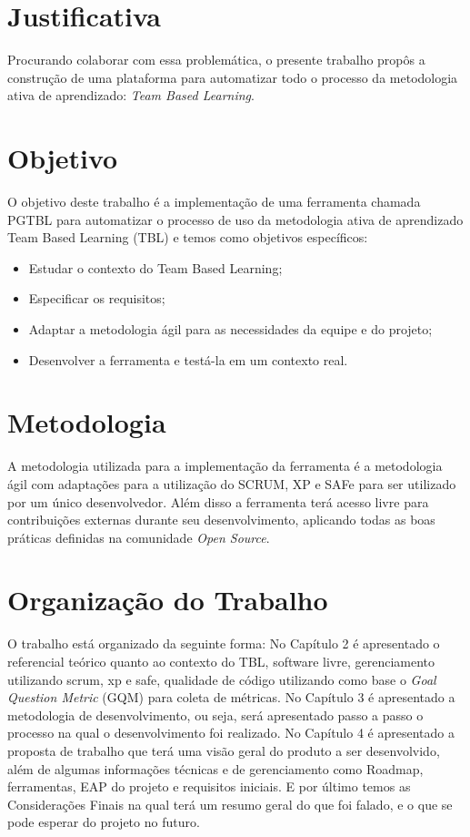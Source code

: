 \section{Justificativa}

Procurando colaborar com essa problemática, o presente trabalho propôs a construção de uma plataforma para automatizar
todo o processo da metodologia ativa de aprendizado: \textit{Team Based Learning}.

\section{Objetivo}

O objetivo deste trabalho é a implementação de uma ferramenta chamada PGTBL para automatizar o processo de uso da metodologia ativa de aprendizado Team Based Learning (TBL) e temos como objetivos específicos:

\begin{itemize}
  \item Estudar o contexto do Team Based Learning;
  \item Especificar os requisitos;
  \item Adaptar a metodologia ágil para as necessidades da equipe e do projeto;
  \item Desenvolver a ferramenta e testá-la em um contexto real.
\end{itemize}

\section{Metodologia}

A metodologia utilizada para a implementação da ferramenta é a metodologia ágil com adaptações para a utilização do SCRUM, XP e SAFe para ser utilizado por um único desenvolvedor. Além disso a ferramenta terá acesso livre para contribuições externas durante seu desenvolvimento, aplicando todas as boas práticas definidas na comunidade \textit{Open Source}.

\section{Organização do Trabalho}

O trabalho está organizado da seguinte forma: No Capítulo 2 é apresentado o referencial teórico quanto ao contexto do TBL, software livre, gerenciamento utilizando scrum, xp e safe, qualidade de código utilizando como base o \textit{Goal Question Metric} (GQM) para coleta de métricas. No Capítulo 3 é apresentado a metodologia de desenvolvimento, ou seja, será apresentado passo a passo o processo na qual o desenvolvimento foi realizado. No Capítulo 4 é apresentado a proposta de trabalho que terá uma visão geral do produto a ser desenvolvido, além de algumas informações técnicas e de gerenciamento como Roadmap, ferramentas, EAP do projeto e requisitos iniciais. E por último temos as Considerações Finais na qual terá um resumo geral do que foi falado, e o que se pode esperar do projeto no futuro.

